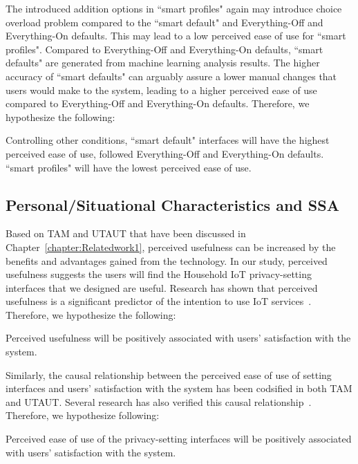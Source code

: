 The introduced addition options in ``smart profiles" again may introduce choice overload problem compared to the ``smart default" and Everything-Off and Everything-On defaults. This may lead to a low perceived ease of use for ``smart profiles". Compared to Everything-Off and Everything-On defaults, ``smart defaults" are generated from machine learning analysis results. The higher accuracy of ``smart defaults" can arguably assure a lower manual changes that users would make to the system, leading to a higher perceived ease of use compared to Everything-Off and Everything-On defaults. Therefore, we hypothesize the following:
\begin{theorem}
	Controlling other conditions, ``smart default" interfaces will have the highest perceived ease of use, followed Everything-Off and Everything-On defaults. ``smart profiles" will have the lowest perceived ease of use.
\end{theorem}

\subsection{Personal/Situational Characteristics and SSA}
Based on TAM and UTAUT that have been discussed in Chapter~\ref{chapter:Relatedwork1}, perceived usefulness can be increased by the benefits and advantages gained from the technology. In our study, perceived usefulness suggests the users will find the Household IoT privacy-setting interfaces that we designed are useful. Research has shown that perceived usefulness is a significant predictor of the intention to use IoT services~\cite{coughlan2012exploring}. Therefore, we hypothesize the following:
\theoremgroup
\begin{theorem}
	Perceived usefulness will be positively associated with users' satisfaction with the system.
\end{theorem}

Similarly, the causal relationship between the perceived ease of use of setting interfaces and users' satisfaction with the system has been codsified in both TAM and UTAUT. Several research has also verified this causal relationship~\cite{gao2014unified, dong2017understanding, choi2016smartwatch}. Therefore, we hypothesize following:
\theoremgroup
\begin{theorem}
	Perceived ease of use of the privacy-setting interfaces will be positively associated with users' satisfaction with the system.
\end{theorem}

